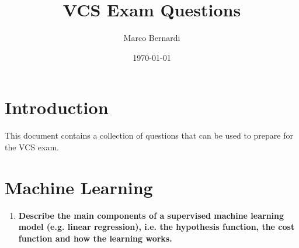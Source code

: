 \documentclass[12pt]{article}
\title{VCS Exam Questions}
\author{Marco Bernardi}
\date{\today}
\begin{document}
\maketitle

\section{Introduction}
This document contains a collection of questions that can be used to prepare for the VCS exam.
\section{Machine Learning}
\begin {enumerate}
    \item \textbf{Describe the main components of a supervised machine learning model (e.g. linear regression), 
    i.e. the hypothesis function, the cost function and how the learning works.}


\end{enumerate}
\end{document}
